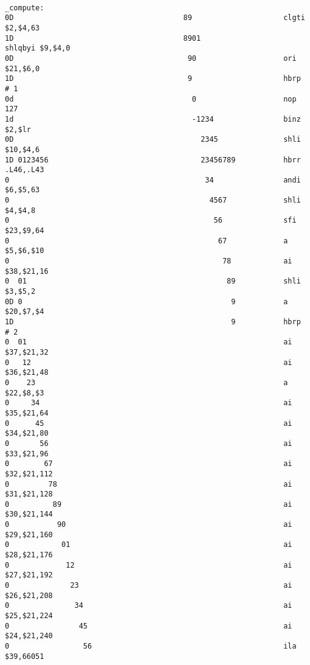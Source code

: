 \scriptsize
\begin{verbatim}
                                                               _compute:
0D                                       89                    	clgti	$2,$4,63
1D                                       8901                  	shlqbyi	$9,$4,0
0D                                        90                   	ori	$21,$6,0
1D                                        9                    	hbrp	# 1
0d                                         0                   	nop	127
1d                                         -1234               	binz	$2,$lr
0D                                           2345              	shli	$10,$4,6
1D 0123456                                   23456789          	hbrr	.L46,.L43
0                                             34               	andi	$6,$5,63
0                                              4567            	shli	$4,$4,8
0                                               56             	sfi	$23,$9,64
0                                                67            	a	$5,$6,$10
0                                                 78           	ai	$38,$21,16
0  01                                              89          	shli	$3,$5,2
0D 0                                                9          	a	$20,$7,$4
1D                                                  9          	hbrp	# 2
0  01                                                          	ai	$37,$21,32
0   12                                                         	ai	$36,$21,48
0    23                                                        	a	$22,$8,$3
0     34                                                       	ai	$35,$21,64
0      45                                                      	ai	$34,$21,80
0       56                                                     	ai	$33,$21,96
0        67                                                    	ai	$32,$21,112
0         78                                                   	ai	$31,$21,128
0          89                                                  	ai	$30,$21,144
0           90                                                 	ai	$29,$21,160
0            01                                                	ai	$28,$21,176
0             12                                               	ai	$27,$21,192
0              23                                              	ai	$26,$21,208
0               34                                             	ai	$25,$21,224
0                45                                            	ai	$24,$21,240
0                 56                                           	ila	$39,66051

\end{verbatim}
